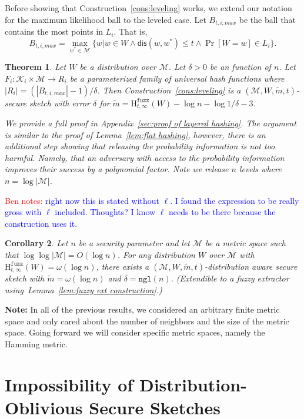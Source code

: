 \documentclass[11pt]{article}
\newcommand{\apref}[1]{\mbox{Appendix~\ref{#1}}}
\newcommand{\lemref}[1]{\mbox{Lemma~\ref{#1}}}
\newcommand{\consref}[1]{\mbox{Construction~\ref{#1}}}
\newcommand{\dis}{\ensuremath{\mathsf{dis}}}
\newcommand{\ngl}{\ensuremath{\mathtt{ngl}}\xspace}
\newcommand{\Hfuzz}{\mathrm{H}^{\mathtt{fuzz}}_{t,\infty}}
\newtheorem{theorem}{Theorem}[section]
\newtheorem{corollary}[theorem]{Corollary}
\newcommand{\authnote}[2]{{\textcolor{red}{\textsf{#1 notes: }\textcolor{blue}{ #2}}\marginpar{\textcolor{red}{\textbf{!!!!!}}}}}
\newcommand{\authnote}[2]{}
\newcommand{\bnote}[1]{{\authnote{Ben}{#1}}}
\begin{document}
\noindent Before showing that \consref{cons:leveling} works, we extend our notation for the maximum likelihood ball to the leveled case.  Let $B_{t, i, max}$ be the ball that contains the most points in $L_i$.  That is,
\[
B_{t, i, max} = \max_{w^* \in \mathcal{M}} \{w | w\in W \wedge \dis(w, w^*)\le t \wedge \Pr[W=w]\in L_i\}.
\]
\begin{theorem}
\label{thm:layered hashing}
Let $W$ be a distribution over $\mathcal{M}$.  Let $\delta>0$ be an function of $n$.  Let $F_i: \mathcal{K}_i \times \mathcal{M}\rightarrow R_i$ be a parameterized family of universal hash functions where $|R_i| = (|B_{t, i, max}|-1) /\delta$.  Then \consref{cons:leveling} is a $(\mathcal{M}, W, \tilde{m}, t)$-secure sketch with error $\delta$ for $\tilde{m} = \Hfuzz(W) - \log n - \log 1/\delta - 3$.

We provide a full proof in \apref{sec:proof of layered hashing}.  The argument is similar to the proof of \lemref{lem:flat hashing}, however, there is an additional step showing that releasing the probability information is not too harmful.  Namely, that an adversary with access to the probability information improves their success by a polynomial factor.  Note we release $n$ levels where $n =\log |\mathcal{M}|$.

\end{theorem}
\bnote{right now this is stated without $\ell$.  I found the expression to be really gross with $\ell$ included.  Thoughts?  I know $\ell$ needs to be there because the construction uses it.}

\begin{corollary}
\label{cor:extension to fuzz ext}
Let $n$ be a security parameter and let $\mathcal{M}$ be a metric space such that $\log \log |\mathcal{M}| = O(\log n)$.
For any distribution $W$ over $\mathcal{M}$ with $\Hfuzz(W)=\omega(\log n)$, there exists a $(\mathcal{M}, W, \tilde{m}, t)$-distribution aware secure sketch with $\tilde{m} = \omega(\log n)$ and $\delta = \ngl(n)$.  (Extendible to a fuzzy extractor using~\lemref{lem:fuzzy ext construction}.)
\end{corollary}

\textbf{Note:} In all of the previous results, we considered an arbitrary finite metric space and only cared about the number of neighbors and the size of the metric space.  Going forward we will consider specific metric spaces, namely the Hamming metric.
\section{Impossibility of Distribution-Oblivious Secure Sketches}
\label{sec:dist oblivious}
\end{document}
